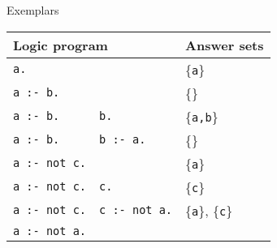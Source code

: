 \begin{frame}[c]{Exemplars}
  \centering
  \begin{tabular}{|ll|l|}
    \hline
    \multicolumn{2}{|l|}{Logic program} & Answer sets\\
    \hline
    \hline
    \texttt{a.}          &                      & \{\texttt{a}\}\\
    \hline
    \texttt{a :- b.}     &                      & \{\}\\
    \hline
    \texttt{a :- b.}     & \texttt{b.}          & \{\texttt{a,b}\}\\
    \hline
    \texttt{a :- b.}     & \texttt{b :- a.}     & \{\}\\
    \hline
    \texttt{a :- not c.} &                      & \{\texttt{a}\}\\
    \hline
    \texttt{a :- not c.} & \texttt{c.}          & \{\texttt{c}\}\\
    \hline
    \texttt{a :- not c.} & \texttt{c :- not a.} & \{\texttt{a}\}, \{\texttt{c}\}\\
    \hline
    \texttt{a :- not a.} &                      & \\
    \hline
  \end{tabular}
\end{frame}
%
